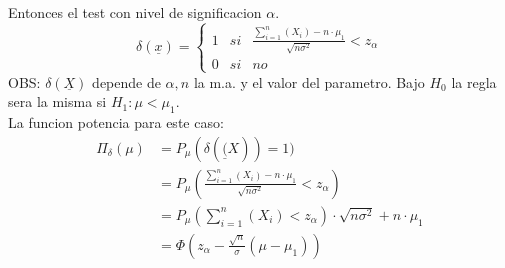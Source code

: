 \documentclass[titlepage,a4paper]{article}
\begin{document}
Entonces el test con nivel de significacion $\alpha$.
\begin{equation*}
    \delta(\underline{x})= \left\{ \begin{array}{lcc}
        1 &   si  & \frac{\sum_{i=1}^{n}(X_{i})-n \cdot \mu_{1}}{\sqrt{n\sigma^{2}}}< z _{\alpha} \\
        0 &  si & no
        \end{array}
    \right.
\end{equation*}
OBS: $\delta(\underline{X})$ depende de $\alpha, n$ la m.a. y el valor del parametro. Bajo $H_{0}$ la regla sera la misma si $H_{1}: \mu<\mu_{1}$.\\
La funcion potencia para este caso:
\begin{eqnarray*}
    \Pi_{\delta}(\mu) &= P_{\mu}(\delta(\underline(X))=1)\\
    &= P_{\mu} (\frac{\sum_{i=1}^{n}(X_{i})-n \cdot \mu_{1}}{\sqrt{n\sigma^{2}}}< z _{\alpha})\\
    &=P_{\mu} (\sum_{i=1}^{n}(X_{i})< z _{\alpha}) \cdot \sqrt{n\sigma^{2}} + n \cdot \mu_{1}\\
    &= \Phi(z_{\alpha} - \frac{\sqrt{n}}{\sigma}(\mu -\mu_{1}) )
\end{eqnarray*}
\end{document}
